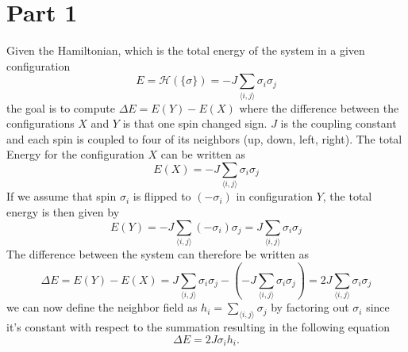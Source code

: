 \section*{Part 1}
Given the Hamiltonian, which is the total energy of the system in a given configuration
\begin{equation}
	E=\mathcal{H}(\{\sigma\})=-J \sum_{\langle i, j\rangle} \sigma_i \sigma_j
\end{equation}
the goal is to compute $\Delta E = E(Y) - E(X)$ where the difference between the configurations $X$ and $Y$ is that one spin changed sign.
$J$ is the coupling constant and each spin is coupled to four of its neighbors (up, down, left, right). \newline
\newline
The total Energy for the configuration $X$ can be written as
\begin{equation}
	E(X)=-J \sum_{\langle i, j\rangle} \sigma_i \sigma_j
\end{equation}
If we assume that spin $\sigma_i$ is flipped  to $(-\sigma_i)$ in configuration $Y$, the total energy is then given by
\begin{equation}
	E(Y)=-J \sum_{\langle i, j\rangle} (-\sigma_i) \sigma_j = J \sum_{\langle i, j\rangle} \sigma_i \sigma_j
\end{equation}
The difference between the system can therefore be written as
\begin{equation}
	\Delta E = E(Y) - E(X) = J \sum_{\langle i, j\rangle} \sigma_i \sigma_j - (-J \sum_{\langle i, j\rangle} \sigma_i \sigma_j) =  2J \sum_{\langle i, j\rangle} \sigma_i \sigma_j  
\end{equation}
we can now define the neighbor field as $h_i = \sum_{\langle i, j\rangle} \sigma_j$ by factoring out $\sigma_i$ since it's constant with respect to the summation resulting in the following equation
\begin{equation}
	\Delta E = 2J\sigma_i h_i.
\end{equation}
